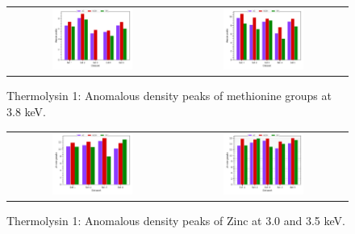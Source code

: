 \begin{figure}
    \centering
    \begin{tabular}{cc}
        \includegraphics[width = 0.5\textwidth]{plots/exp1/tlys_9_P6122/peaks/3p8_met120.pdf} & \includegraphics[width = 0.5\textwidth]{plots/exp1/tlys_9_P6122/peaks/3p8_met250.pdf}
    \end{tabular}
    \caption{Thermolysin 1: Anomalous density peaks of methionine groups at 3.8 \unit{keV}.}
    \label{fig:tlys9_met_peaks_3p8}
\end{figure}

\begin{figure}
    \centering
    \begin{tabular}{cc}
        \includegraphics[width = 0.5\textwidth]{plots/exp1/tlys_2_P6122/peaks/3p0_zinc.pdf} & \includegraphics[width = 0.5\textwidth]{plots/exp1/tlys_2_P6122/peaks/3p5_zinc.pdf}
    \end{tabular}
    \caption{Thermolysin 1: Anomalous density peaks of Zinc at 3.0 and 3.5 \unit{keV}.}
    \label{fig:tlys9_zn_peaks_3p0_3p5}
\end{figure}

